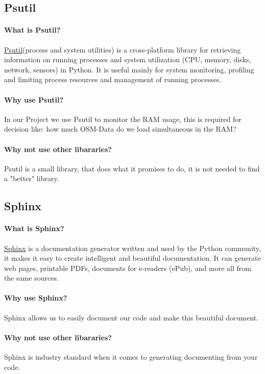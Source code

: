 \documentclass[letterpaper,10pt,english]{sphinxmanual}
\begin{document}
\subsection{Psutil}
\paragraph{What is Psutil?}
\href{https://pypi.org/project/psutil/}{Psutil}(process and system utilities) is a cross-platform library for retrieving information on running processes and system utilization (CPU, memory, disks, network, sensors) in Python. It is useful mainly for system monitoring, profiling and limiting process resources and management of running processes. 

\paragraph{Why use Psutil?}
In our Project we use Psutil to monitor the RAM usage, this is required for decision like: how much OSM-Data do we load simultaneous in the RAM?

\paragraph{Why not use other libararies?}
Psutil is a small  library, that does what it promises to do, it is not needed to find a "better" library.

\subsection{Sphinx}

\paragraph{What is Sphinx?}
\href{https://www.sphinx-doc.org/en/master/}{Sphinx} is a documentation generator written and used by the Python community, it makes it easy to create intelligent and beautiful documentation.
It can generate web pages, printable PDFs, documents for e-readers (ePub), and more all from the same sources.

\paragraph{Why use Sphinx?}
Sphinx allows us to easily document our code and make this beautiful document.

\paragraph{Why not use other libararies?}
Sphinx is industry standard when it comes to generating documenting from your code.
\end{document}
